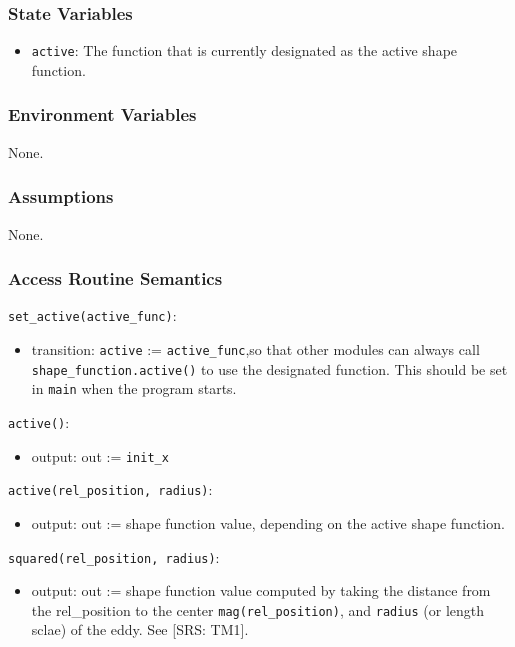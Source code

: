 \documentclass[12pt, titlepage]{article}
\begin{document}
\subsubsection{State Variables}
\begin{itemize}
  \item \texttt{active}: The function that is currently designated as the active shape function.
\end{itemize}

\subsubsection{Environment Variables}
None.

\subsubsection{Assumptions}
None.

\subsubsection{Access Routine Semantics}

\noindent \texttt{set\_active(active\_func)}:
\begin{itemize}
\item transition: \texttt{active} := \texttt{active\_func},\newline so that other modules can always call \texttt{shape\_function.active()} to use the designated function. This should be set in \texttt{main} when the program starts.
\end{itemize}

\noindent \texttt{active()}:
\begin{itemize}
  \item output: out := \texttt{init\_x}
\end{itemize}

\noindent \texttt{active(rel\_position, radius)}:
\begin{itemize}
  \item output: out := shape function value, depending on the active shape function.
\end{itemize}

\noindent \texttt{squared(rel\_position, radius)}:
\begin{itemize}
  \item output: out := shape function value computed by taking the distance from the rel\_position to the center \texttt{mag(rel\_position)}, and \texttt{radius} (or length sclae) of the eddy. See [SRS: TM1].
\end{itemize}
\end{document}
